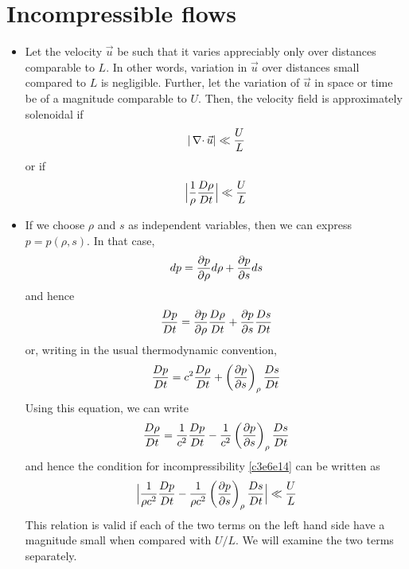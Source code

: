 \section{Incompressible flows}\label{c3s7}
\begin{itemize}
\item Let the velocity $\vec{u}$ be such that it varies appreciably only over distances comparable to $L$. In other words, variation in $\vec{u}$ over distances small compared to $L$ is
negligible. Further, let the variation of $\vec{u}$ in space or time be of a magnitude comparable to $U$. Then, the velocity field is approximately solenoidal if
\[
|\operatorname{\nabla\cdot}\vec{u}| \ll \frac{U}{L}
\]
or if
\begin{equation}\label{c3s7e1}
\Big|\frac{1}{\rho}\frac{D{\rho}}{Dt}\Big| \ll \frac{U}{L}
\end{equation}

\item If we choose $\rho$ and $s$ as independent variables, then we can express $p = p(\rho, s)$. In that case,
\[
dp = \frac{\partial{p}}{\partial{\rho}}d\rho + \frac{\partial{p}}{\partial{s}}ds
\]
and hence
\[
\frac{D{p}}{Dt} = \frac{\partial{p}}{\partial{\rho}}\frac{D{\rho}}{Dt} + \frac{\partial{p}}{\partial{s}}\frac{D{s}}{Dt}
\]
or, writing in the usual thermodynamic convention,
\begin{equation}\label{c3s7e2}
\frac{D{p}}{Dt} = c^2\frac{D{\rho}}{Dt} + \left(\frac{\partial{p}}{\partial{s}}\right)_\rho\frac{D{s}}{Dt}
\end{equation}
Using this equation, we can write
\[
\frac{D{\rho}}{Dt} = \frac{1}{c^2}\frac{D{p}}{Dt} - \frac{1}{c^2}\left(\frac{\partial{p}}{\partial{s}}\right)_\rho\frac{D{s}}{Dt}
\]
and hence the condition for incompressibility \eqref{c3e6e14} can be written as
\begin{equation}\label{c3s7e3}
\Big|\frac{1}{\rho c^2}\frac{D{p}}{Dt} - \frac{1}{\rho c^2}\left(\frac{\partial{p}}{\partial{s}}\right)_\rho\frac{D{s}}{Dt}\Big| \ll \frac{U}{L}
\end{equation}
This relation is valid if each of the two terms on the left hand side have a magnitude small when compared with $U/L$. We will examine the two terms separately.


\end{itemize}
